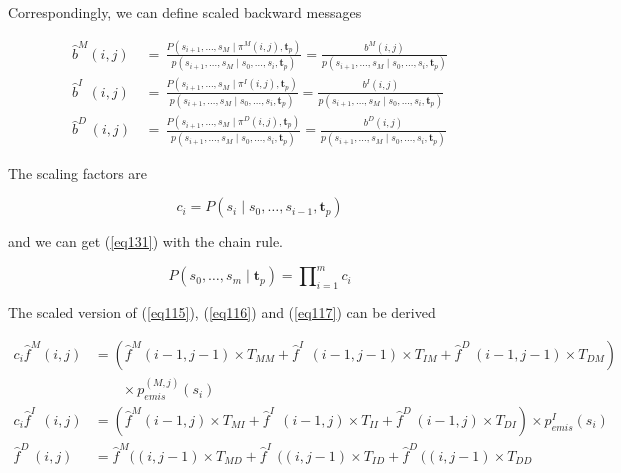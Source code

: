 \documentclass[10pt]{article}
\begin{document}
    Correspondingly, we can define scaled backward messages

    \begin{equation}
    \begin{aligned}
      \widehat{b}^{M}(i, j) \,&=\, \frac{P(s_{i+1}, \dots,s_M \;|\; \pi^M(i, j), \mathbf{t}_{p})}{p(s_{i+1}, \dots,s_M \;|\; s_0, \dots,s_{i}, \mathbf{t}_{p})} = \frac{b^{M}(i, j)}{p(s_{i+1}, \dots,s_M \;|\; s_0, \dots,s_{i}, \mathbf{t}_{p})} \\
      \widehat{b}^{I\;\;}(i, j) \,&=\, \frac{P(s_{i+1}, \dots,s_M \;|\; \pi^{I}(i, j), \mathbf{t}_{p})}{p(s_{i+1}, \dots,s_M \;|\; s_0, \dots,s_{i}, \mathbf{t}_{p})} = \frac{b^{I}(i, j)}{p(s_{i+1}, \dots,s_M \;|\; s_0, \dots,s_{i}, \mathbf{t}_{p})} \\
      \widehat{b}^{D\;}(i, j) \,&=\, \frac{P(s_{i+1}, \dots,s_M \;|\; \pi^{D}(i, j), \mathbf{t}_{p})}{p(s_{i+1}, \dots,s_M \;|\; s_0, \dots,s_{i}, \mathbf{t}_{p})} = \frac{b^{D}(i, j)}{p(s_{i+1}, \dots,s_M \;|\; s_0, \dots,s_{i}, \mathbf{t}_{p})}
    \end{aligned}
    \end{equation}

    The scaling factors are

    \begin{equation}
      c_{i} = P(s_{i} \;|\; s_0, \dots,s_{i-1},\mathbf{t}_{p})
    \end{equation}

    and we can get (\ref{eq131}) with the chain rule.

    \begin{equation} \label{eq131}
      P(s_0, \dots,s_m \;|\; \mathbf{t}_{p}) = \prod\nolimits_{i=1}^{m} c_i
    \end{equation}

    The scaled version of (\ref{eq115}), (\ref{eq116}) and (\ref{eq117}) can be derived

    \begin{align}
      c_{i} \widehat{f}^{M}(i, j) &= (\widehat{f}^{M}(i-1, j-1) \times T_{MM}  + \widehat{f}^{I\;\;}(i-1, j-1) \times T_{IM} + \widehat{f}^{D\;}(i-1, j-1) \times T_{DM}) \label{eq132} \\ 
        &\qquad\times p_{emis}^{(M, j)}(s_{i}) \nonumber \\
      c_{i} \widehat{f}^{I\;\;}(i, j) &= (\widehat{f}^{M}(i-1, j) \times T_{MI}  + \widehat{f}^{I\;\;}(i-1, j) \times T_{II} + \widehat{f}^{D\;}(i-1, j) \times T_{DI}) \times p_{emis}^{I}(s_{i}) \label{eq133} \\
      \widehat{f}^{D\;}(i, j) &= \widehat{f}^{M}((i, j-1) \times T_{MD}  + \widehat{f}^{I\;\;}((i, j-1) \times T_{ID} + \widehat{f}^{D\;}((i, j-1) \times T_{DD}
    \end{align}
\end{document}
